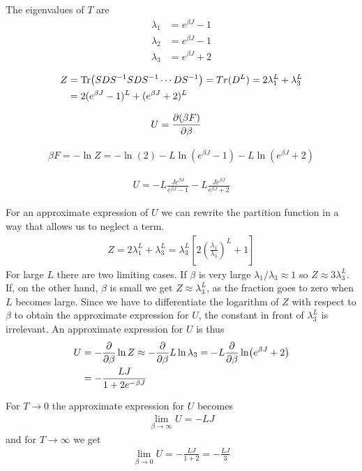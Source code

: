 \documentclass[reprint,english,notitlepage,aps,nobalancelastpage,nofootinbib]{revtex4-1}
\newcommand{\closed}[1]{\left(#1\right)}
\newcommand{\bracket}[1]{\left[#1\right]}
\newcommand{\ebj}{e^{\beta J}}
\renewcommand{\l}{\lambda}
\begin{document}
The eigenvalues of $T$ are 
\begin{align*}
	\lambda_1 &= \ebj-1 \\ 
	\lambda_2 &= \ebj-1 \\ 
	\lambda_3 &= \ebj+2
\end{align*}


\begin{align*}
	Z &= \Tr(SDS^{-1}SDS^{-1}\cdots DS^{-1})=Tr(D^L)=2\lambda_1^L + \lambda_3^L \\ 
	&= 2(\ebj-1)^L + (\ebj+2)^L
\end{align*}

\begin{align*}
	U &= \pdv{(\beta F)}{\beta}
\end{align*}

\begin{align*}
	\beta F = -\ln Z = -\ln(2)-L\ln(\ebj-1)-L\ln(\ebj+2)
\end{align*}

\begin{align*}
	U = -L \frac{J\ebj}{\ebj-1} - L \frac{J\ebj}{\ebj+2}
\end{align*}

For an approximate expression of $U$ we can rewrite the partition function in a way that allows us to neglect a term. 
\begin{align*}
	Z = 2\l_1^L + \l_3^L = \l_3^L\bracket{2\closed{\frac{\l_1}{\l_3}}^L+1}
\end{align*} 
For large $L$ there are two limiting cases. If $\beta$ is very large $\l_1/\l_3\approx1$ so $Z\approx 3\l_3^L$. If, on the other hand, $\beta$ is small we get $Z\approx \l_3^L$, as the fraction goes to zero when $L$ becomes large. Since we have to differentiate the logarithm of $Z$ with respect to $\beta$ to obtain the approximate expression for $U$, the constant in front of $\l_3^L$ is irrelevant. An approximate expression for $U$ is thus 
\begin{align*}
	U&=-\pdv{\beta}\ln Z \approx -\pdv{\beta} L \ln \l_3 = -L \pdv{\beta}\ln (\ebj+2) \\ 
	&= -\frac{LJ}{1+2 e^{-\beta J}} 
\end{align*}

For $T\to0$ the approximate expression for $U$ becomes 
\begin{align*}
	\lim_{\beta\to\infty} U = -LJ
\end{align*}
and for $T\to\infty$ we get 
\begin{align*}
	\lim_{\beta\to0} U = -\frac{LJ}{1+2}=-\frac{LJ}{3}
\end{align*}
\end{document}
